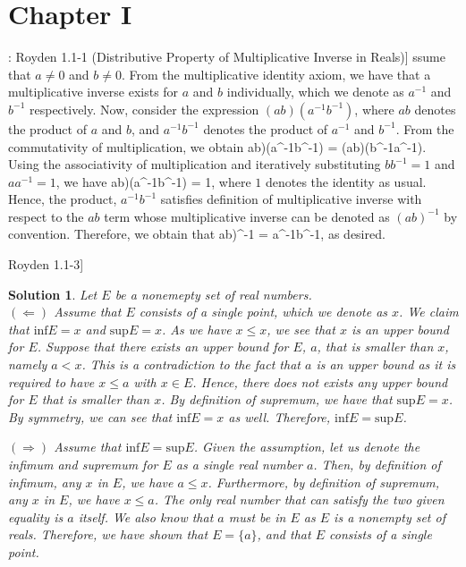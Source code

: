 \documentclass{article} %
\def\eQb#1\eQe{\begin{eqnarray*}#1\end{eqnarray*}}
\def\Qb#1\Qe{\begin{question}#1\end{question}}
\def\Sb#1\Se{\begin{solution}#1\end{solution}}
\theoremstyle{quest}
\newtheorem*{question}{Question}
\newtheorem*{solution}{Solution}
\begin{document}
\section{Chapter I}

\Qb[: Royden 1.1-1 (Distributive Property of Multiplicative Inverse in Reals)]
\Qe
\Sb
Assume that $a \neq 0$ and $b \neq 0$. From the multiplicative identity axiom,
we have that a multiplicative inverse exists for $a$ and $b$ individually, which we denote as
$a^{-1}$ and $b^{-1}$ respectively.
Now, consider the expression $(ab)(a^{-1}b^{-1})$, where $ab$ denotes the 
product of $a$ and $b$, and $a^{-1}b^{-1}$ denotes the product of $a^{-1}$ and $b^{-1}$.
From the commutativity of multiplication,
we obtain
\eQb
(ab)(a^{-1}b^{-1}) = (ab)(b^{-1}a^{-1}).
\eQe
Using the associativity of multiplication and iteratively substituting $bb^{-1} = 1$ and $aa^{-1} = 1$,
we have
\eQb
(ab)(a^{-1}b^{-1}) = 1,
\eQe
where $1$ denotes the identity as usual. Hence, the product, $a^{-1}b^{-1}$ satisfies definition
of multiplicative inverse with respect to the $ab$ term whose multiplicative inverse can be denoted
as $(ab)^{-1}$ by convention. Therefore, we obtain that
\eQb
(ab)^{-1} = a^{-1}b^{-1},
\eQe
as desired.
\Se

\bigskip

\Qb[Royden 1.1-3]
\Qe
\begin{solution}
Let $E$ be a nonemepty set of real numbers.\\ 
$\mathbf{( \Leftarrow )}$ Assume that 
$E$ consists of a single point, which we denote as $x$. We claim that
$\text{inf}E = x$ and $\text{sup}E = x$. As we have $x \leq x$, we see that $x$ is an upper bound
for $E$. Suppose that there exists an upper bound for $E$, $a$, that is smaller than $x$, namely 
$a < x$. This is a contradiction to the fact that $a$ is an upper bound as it is required to have
$x \leq a$ with $x \in E$. Hence, there does not exists any upper bound for $E$ that is smaller than
$x$. By definition of supremum, we have that $\text{sup}E = x$. By symmetry, we can see that
$\text{inf}E = x$ as well. Therefore, $\text{inf}E = \text{sup}E$. \\ 

\smallskip

$\mathbf{( \Rightarrow )}$ Assume that $\text{inf} E = \text{sup} E$. 
Given the assumption, let us denote the infimum and supremum for $E$ as a
single real number $a$. Then, by definition of infimum, any $x$ in $E$, we have
$a \leq x$. Furthermore, by definition of supremum, any $x$ in $E$, we have $x \leq a$.
The only real number that can satisfy the two given equality is $a$ itself. We also know
that $a$ must be in $E$ as $E$ is a nonempty set of reals. Therefore, 
we have shown that $E = \{ a \}$, and that $E$ consists of a single point.
\end{solution}
\end{document}
